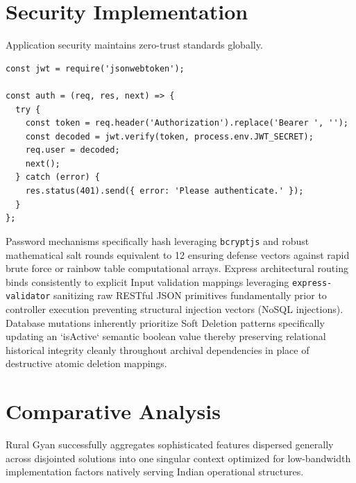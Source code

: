 \documentclass[12pt, journal, onecolumn]{IEEEtran}
\begin{document}
\section{Security Implementation}

Application security maintains zero-trust standards globally. 
\begin{lstlisting}[caption=Authorization Middleware using JWT]
const jwt = require('jsonwebtoken');

const auth = (req, res, next) => {
  try {
    const token = req.header('Authorization').replace('Bearer ', '');
    const decoded = jwt.verify(token, process.env.JWT_SECRET);
    req.user = decoded;
    next();
  } catch (error) {
    res.status(401).send({ error: 'Please authenticate.' });
  }
};
\end{lstlisting}

Password mechanisms specifically hash leveraging \texttt{bcryptjs} and robust mathematical salt rounds equivalent to 12 ensuring defense vectors against rapid brute force or rainbow table computational arrays.
Express architectural routing binds consistently to explicit Input validation mappings leveraging \texttt{express-validator} sanitizing raw RESTful JSON primitives fundamentally prior to controller execution preventing structural injection vectors (NoSQL injections).
Database mutations inherently prioritize Soft Deletion patterns specifically updating an `isActive` semantic boolean value thereby preserving relational historical integrity cleanly throughout archival dependencies in place of destructive atomic deletion mappings.

\section{Comparative Analysis}
Rural Gyan successfully aggregates sophisticated features dispersed generally across disjointed solutions into one singular context optimized for low-bandwidth implementation factors natively serving Indian operational structures. 
\end{document}
